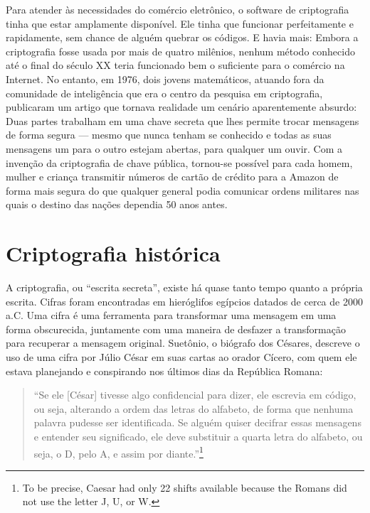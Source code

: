 \documentclass{book}
\begin{document}
Para atender às necessidades do comércio eletrônico, o software de criptografia tinha que estar amplamente disponível. Ele tinha que funcionar perfeitamente e rapidamente, sem chance de alguém quebrar os códigos. E havia mais: Embora a criptografia fosse usada por mais de quatro milênios, nenhum método conhecido até o final do século XX teria funcionado bem o suficiente para o comércio na Internet. No entanto, em 1976, dois jovens matemáticos, atuando fora da comunidade de inteligência que era o centro da pesquisa em criptografia, publicaram um artigo que tornava realidade um cenário aparentemente absurdo: Duas partes trabalham em uma chave secreta que lhes permite trocar mensagens de forma segura --- mesmo que nunca tenham se conhecido e todas as suas mensagens um para o outro estejam abertas, para qualquer um ouvir. Com a invenção da criptografia de chave pública, tornou-se possível para cada homem, mulher e criança transmitir números de cartão de crédito para a Amazon de forma mais segura do que qualquer general podia comunicar ordens militares nas quais o destino das nações dependia 50 anos antes.

\section{Criptografia histórica}
\label{segredos:historica}

A criptografia, ou ``escrita secreta'', existe há quase tanto tempo quanto a própria escrita. Cifras foram encontradas em hieróglifos egípcios datados de cerca de 2000 a.C. Uma cifra é uma ferramenta para transformar uma mensagem em uma forma obscurecida, juntamente com uma maneira de desfazer a transformação para recuperar a mensagem original. Suetônio, o biógrafo dos Césares, descreve o uso de uma cifra por Júlio César em suas cartas ao orador Cícero, com quem ele estava planejando e conspirando nos últimos dias da República Romana:

\begin{quote}
    ``Se ele [César] tivesse algo confidencial para dizer, ele escrevia em código, ou seja, alterando a ordem das letras do alfabeto, de forma que nenhuma palavra pudesse ser identificada. Se alguém quiser decifrar essas mensagens e entender seu significado, ele deve substituir a quarta letra do alfabeto, ou seja, o D, pelo A, e assim por diante.''\footnote{To be precise, Caesar had only 22 shifts available because the Romans did not use the letter J, U, or W.}
\end{quote}
\end{document}
